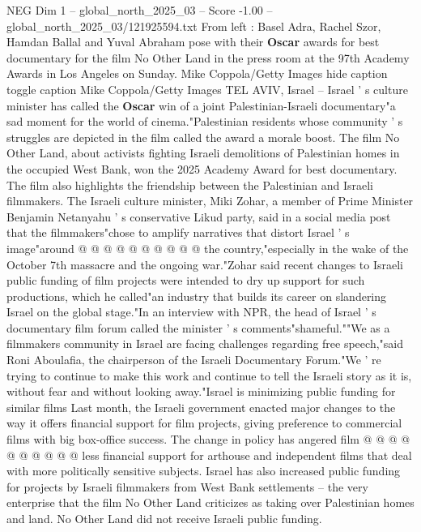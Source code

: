 \begin{textsample}{NEG Dim 1 – global\_north\_2025\_03 – Score -1.00 – global\_north\_2025\_03/121925594.txt}  \label{ex:f1_neg_033}
From left : Basel Adra, Rachel Szor, Hamdan Ballal and Yuval Abraham pose with their \textbf{Oscar} awards for best documentary for the film No Other Land in the press room at the 97th Academy Awards in Los Angeles on Sunday.
Mike Coppola/Getty Images hide caption toggle caption Mike Coppola/Getty Images TEL AVIV, Israel -- Israel ' s culture minister has called the \textbf{Oscar} win of a joint Palestinian-Israeli documentary"a sad moment for the world of cinema."Palestinian residents whose community ' s struggles are depicted in the film called the award a morale boost.
The film No Other Land, about activists fighting Israeli demolitions of Palestinian homes in the occupied West Bank, won the 2025 Academy Award for best documentary.
The film also highlights the friendship between the Palestinian and Israeli filmmakers.
The Israeli culture minister, Miki Zohar, a member of Prime Minister Benjamin Netanyahu ' s conservative Likud party, said in a social media post that the filmmakers"chose to amplify narratives that distort Israel ' s image"around @ @ @ @ @ @ @ @ @ @ the country,"especially in the wake of the October 7th massacre and the ongoing war."Zohar said recent changes to Israeli public funding of film projects were intended to dry up support for such productions, which he called"an industry that builds its career on slandering Israel on the global stage."In an interview with NPR, the head of Israel ' s documentary film forum called the minister ' s comments"shameful.""We as a filmmakers community in Israel are facing challenges regarding free speech,"said Roni Aboulafia, the chairperson of the Israeli Documentary Forum."We ' re trying to continue to make this work and continue to tell the Israeli story as it is, without fear and without looking away."Israel is minimizing public funding for similar films Last month, the Israeli government enacted major changes to the way it offers financial support for film projects, giving preference to commercial films with big box-office success.
The change in policy has angered film @ @ @ @ @ @ @ @ @ @ less financial support for arthouse and independent films that deal with more politically sensitive subjects.
Israel has also increased public funding for projects by Israeli filmmakers from West Bank settlements -- the very enterprise that the film No Other Land criticizes as taking over Palestinian homes and land.
No Other Land did not receive Israeli public funding.

\end{textsample}
